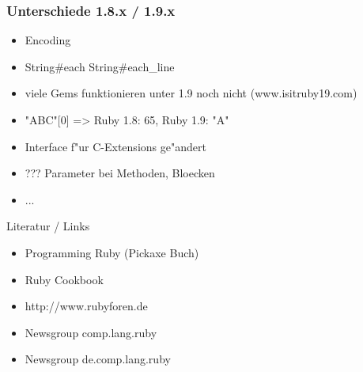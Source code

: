\documentclass{beamer}
\begin{document}
\begin{frame}
 \frametitle{Unterschiede 1.8.x / 1.9.x}
 \begin{itemize}
   \item<1->Encoding
   \item<2->String#each \arrow String#each_line
   \item<3->viele Gems funktionieren unter 1.9 noch nicht (www.isitruby19.com)
   \item<4->"ABC"[0] => Ruby 1.8: 65, Ruby 1.9: "A"
   \item<5->Interface f"ur C-Extensions ge"andert
   \item<6->??? Parameter bei Methoden, Bloecken
   \item ... 
 \end{itemize}

\end{frame}

\begin{frame}
  Literatur / Links
  \begin{itemize}
    \item Programming Ruby (Pickaxe Buch) 
    \item Ruby Cookbook
    \item http://www.rubyforen.de
    \item Newsgroup comp.lang.ruby 
    \item Newsgroup de.comp.lang.ruby 
  \end{itemize}
\end{frame}
\end{document}
